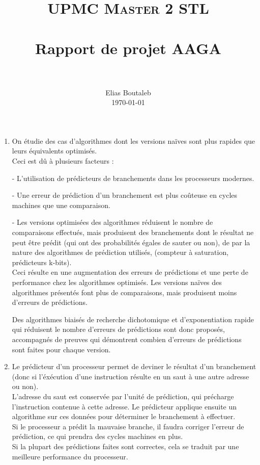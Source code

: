 \documentclass[paper=a4, fontsize=11pt]{scrartcl}
\title{
		\usefont{OT1}{bch}{b}{n}
		\normalfont \normalsize \textsc{UPMC Master 2 STL} \\ [25pt]
		\horrule{0.5pt} \\[0.4cm]
		\huge Rapport de projet AAGA \\
		\horrule{2pt} \\[0.5cm]
}
\author{
		\normalfont 								\normalsize
        Elias Boutaleb\\[-3pt]		\normalsize
        \today
}
\date{}
\numberwithin{equation}{section}		%
\numberwithin{figure}{section}			%
\numberwithin{table}{section}				%
\begin{document}
\maketitle

\begin{enumerate}
\section{Idées maîtresses de l’article}
	\item

On étudie des cas d'algorithmes dont les versions naïves sont plus rapides que leurs équivalents optimisés. \\

Ceci est dû à plusieurs facteurs :

- L'utilisation de prédicteurs de branchements dans les processeurs modernes.

- Une erreur de prédiction d'un branchement est plus coûteuse en cycles machines que une comparaison.

- Les versions optimisées des algorithmes réduisent le nombre de comparaisons effectués, mais produisent des branchements dont le résultat ne peut être prédit (qui ont des probabilités égales de sauter ou non), de par la nature des algorithmes de prédiction utilisés, (compteur à saturation, prédicteurs k-bits). \\

Ceci résulte en une augmentation des erreurs de prédictions et une perte de performance chez les algorithmes optimisés.
Les versions naïves des algorithmes présentés font plus de comparaisons, mais produisent moins d'erreurs de prédictions.

Des algorithmes biaisés de recherche dichotomique et d'exponentiation rapide qui réduisent le nombre d'erreurs de prédictions sont donc proposés, accompagnés de preuves qui démontrent combien d'erreurs de prédictions sont faites pour chaque version.

\clearpage

    \item Le prédicteur d'un processeur permet de deviner le résultat d'un branchement (donc si l'éxécution d'une instruction résulte en un saut à une autre adresse ou non). \\
        L'adresse du saut est conservée par l'unité de prédiction, qui précharge l'instruction contenue à cette adresse. Le prédicteur applique ensuite un algorithme sur ces données pour déterminer le branchement à effectuer. \\
        Si le processeur a prédit la mauvaise branche, il faudra corriger l'erreur de prédiction, ce qui prendra des cycles machines en plus. \\
        Si la plupart des prédictions faites sont correctes, cela se traduit par une meilleure performance du processeur. \\


\end{enumerate}
\end{document}

